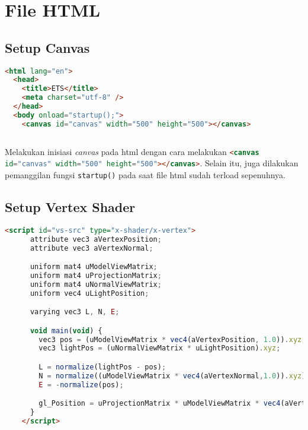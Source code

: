 \section{File HTML}

\subsection*{Setup Canvas}

\begin{lstlisting}[language=html, label={lst: indexHtml}, caption={file index.html}]
<html lang="en">
  <head>
    <title>ETS</title>
    <meta charset="utf-8" />
  </head>
  <body onload="startup();">
    <canvas id="canvas" width="500" height="500"></canvas>
    
\end{lstlisting}

Melakukan inisiasi \textit{canvas} pada html dengan cara melakukan \lstinline[language=html]{<canvas id="canvas" width="500" height="500"></canvas>}. Selain itu, juga dilakukan pemanggilan fungsi \texttt{startup()} pada saat file html sudah terload sepenuhnya.

\subsection*{Setup Vertex Shader}

\begin{lstlisting}[language=html, label={lst: vertexShader}, caption={file vertexShader}]
    <script id="vs-src" type="x-shader/x-vertex">
      attribute vec3 aVertexPosition;
      attribute vec3 aVertexNormal;

      uniform mat4 uModelViewMatrix;
      uniform mat4 uProjectionMatrix;
      uniform mat4 uNormalViewMatrix;
      uniform vec4 uLightPosition;

      varying vec3 L, N, E;

      void main(void) {
        vec3 pos = (uModelViewMatrix * vec4(aVertexPosition, 1.0)).xyz;
        vec3 lightPos = (uNormalViewMatrix * uLightPosition).xyz;

        L = normalize(lightPos - pos);
        N = normalize((uModelViewMatrix * vec4(aVertexNormal,1.0)).xyz);
        E = -normalize(pos);

        gl_Position = uProjectionMatrix * uModelViewMatrix * vec4(aVertexPosition, 1.0);
      }
    </script>

\end{lstlisting}

